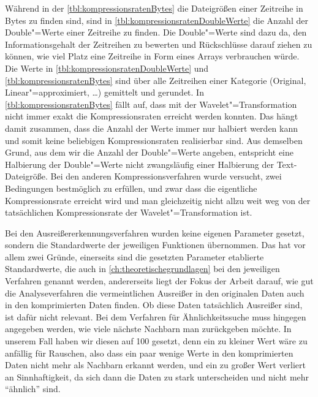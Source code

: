 Während in der \autoref{tbl:kompressionsratenBytes} die Dateigrößen einer Zeitreihe in Bytes zu finden sind, sind in \autoref{tbl:kompressionsratenDoubleWerte} die Anzahl der Double"=Werte einer Zeitreihe zu finden. Die Double"=Werte sind dazu da, den Informationsgehalt der Zeitreihen zu bewerten und Rückschlüsse darauf ziehen zu können, wie viel Platz eine Zeitreihe in Form eines Arrays verbrauchen würde. Die Werte in \autoref{tbl:kompressionsratenDoubleWerte} und \autoref{tbl:kompressionsratenBytes} sind über alle Zeitreihen einer Kategorie (Original, Linear"=approximiert, \dots) gemittelt und gerundet. In \autoref{tbl:kompressionsratenBytes} fällt auf, dass mit der Wavelet"=Transformation nicht immer exakt die Kompressionsraten erreicht werden konnten. Das hängt damit zusammen, dass die Anzahl der Werte immer nur halbiert werden kann und somit keine beliebigen Kompressionsraten realisierbar sind. Aus demselben Grund, aus dem wir die Anzahl der Double"=Werte angeben, entspricht eine Halbierung der Double"=Werte nicht zwangsläufig einer Halbierung der Text-Dateigröße. Bei den anderen Kompressionsverfahren wurde versucht, zwei Bedingungen bestmöglich zu erfüllen, und zwar dass die eigentliche Kompressionsrate erreicht wird und man gleichzeitig nicht allzu weit weg von der tatsächlichen Kompressionsrate der Wavelet"=Transformation ist.

Bei den Ausreißererkennungsverfahren wurden keine eigenen Parameter gesetzt, sondern die Standardwerte der jeweiligen Funktionen übernommen. Das hat vor allem zwei Gründe, einerseits sind die gesetzten Parameter etablierte Standardwerte, die auch in \autoref{ch:theoretischegrundlagen} bei den jeweiligen Verfahren genannt werden, andererseits liegt der Fokus der Arbeit darauf, wie gut die Analyseverfahren die vermeintlichen Ausreißer in den originalen Daten auch in den komprimierten Daten finden. Ob diese Daten tatsächlich Ausreißer sind, ist dafür nicht relevant. Bei dem Verfahren für Ähnlichkeitssuche muss hingegen angegeben werden, wie viele nächste Nachbarn man zurückgeben möchte. In unserem Fall haben wir diesen auf 100 gesetzt, denn ein zu kleiner Wert wäre zu anfällig für Rauschen, also dass ein paar wenige Werte in den komprimierten Daten nicht mehr als Nachbarn erkannt werden, und ein zu großer Wert verliert an Sinnhaftigkeit, da sich dann die Daten zu stark unterscheiden und nicht mehr "`ähnlich"' sind.